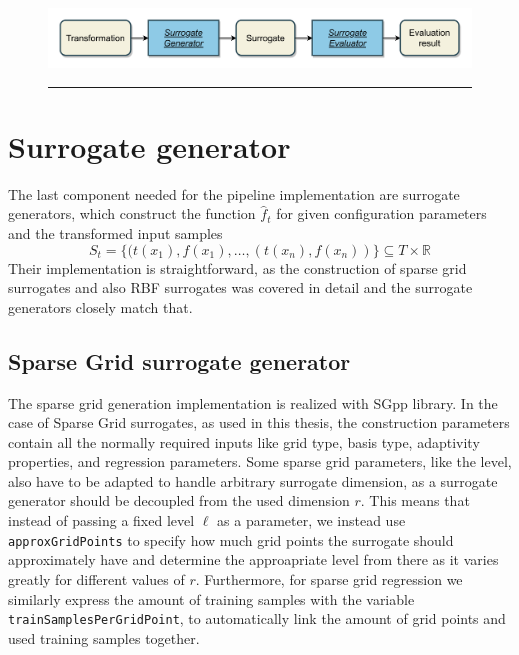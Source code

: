 \documentclass[
  a4paper,  %
  twoside,  %
  bibliography=totoc,
  headsepline,
  cleardoublepage=empty,
  parskip=half,
  draft=false
]{scrbook}
\newcommand{\delimit}{{\color{charcoal}\noindent\rule{\textwidth}{1pt}}}
\begin{document}
\newpage
\begin{mdframed}[style=style,frametitle={Transformation evaluator (forward looking)}]
\begin{figure}[H]
\includegraphics[width=\textwidth]{graphics/TransformationEval.pdf}
\delimit

\label{fig:te}
\end{figure}
\end{mdframed}

\section {Surrogate generator}
\label{sec:sg}

The last component needed for the pipeline implementation are surrogate generators, which construct the function $\hat{f}_t$ for given configuration parameters and the transformed input samples
\begin{equation}
S_t=\{(t(x_1), f(x_1), \dots, (t(x_n), f(x_n))\} \subseteq T \times \mathds{R}
\end{equation}
Their implementation is straightforward, as the construction of sparse grid surrogates and also RBF surrogates was covered in detail and the surrogate generators closely match that.


\subsection {Sparse Grid surrogate generator}

The sparse grid generation implementation is realized with SGpp \cite{} library.
In the case of Sparse Grid surrogates, as used in this thesis, the construction parameters contain all the normally required inputs like grid type, basis type, adaptivity properties, and regression parameters.
Some sparse grid parameters, like the level, also have to be adapted to handle arbitrary surrogate dimension, as a surrogate generator should be decoupled from the used dimension $r$. 
This means that instead of passing a fixed level $\ell$ as a parameter, we instead use \texttt{approxGridPoints} to specify how much grid points the surrogate should approximately have and determine the approapriate level from there as it varies greatly for different values of $r$.
Furthermore, for sparse grid regression we similarly express the amount of training samples with the variable \texttt{trainSamplesPerGridPoint}, to automatically link the amount of grid points and used training samples together.
\end{document}
